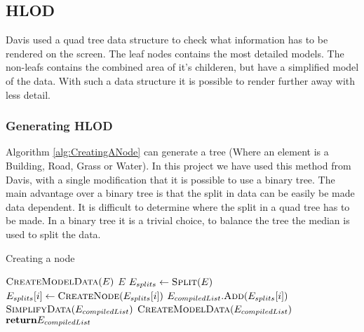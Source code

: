\subsection{HLOD}
\label{subsec:HLOD}
Davis \cite{Davis} used a quad tree data structure to check what information has to be rendered on the screen. The leaf nodes contains the most detailed models. The non-leafs contains the combined area of it's childeren, but have a simplified model of the data. With such a data structure it is possible to render further away with less detail.

\subsubsection{Generating HLOD}
Algorithm \ref{alg:CreatingANode} can generate a tree (Where an element is a Building, Road, Grass or Water). In this project we have used this method from Davis, with a single modification that it is possible to use a binary tree. The main advantage over a binary tree is that the split in data can be easily be made data dependent. It is difficult to determine where the split in a quad tree has to be made. In a binary tree it is a trivial choice, to balance the tree the median is used to split the data.

\begin{algorithm}[h]
\caption{Creating a node}\label{alg:CreatingANode}
\begin{algorithmic}[1]
    \State $\Call{CreateModelData}{E}$
    \State \Return $E$
\Else
    \State $E_{splits}\gets \Call{Split}{E}$ 
        \State $E_{splits}[i] \gets \Call{CreateNode}{E_{splits}[i]}$
        \State $E_{compiledList}.\Call{Add}{E_{splits}[i]}$
    \EndFor
    \State $\Call{SimplifyData}{E_{compiledList}}$
    \State $\Call{CreateModelData}{E_{compiledList}}$
    \State $\Return E_{compiledList}$
\EndIf
\EndProcedure
\end{algorithmic}
\end{algorithm}


